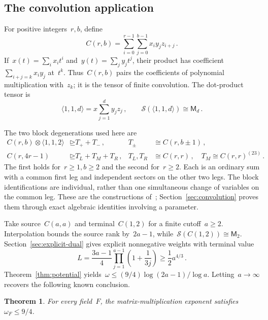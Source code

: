 \documentclass[11pt,letterpaper]{article}
\newtheorem{theorem}{Theorem}[section]
\theoremstyle{definition}
\numberwithin{equation}{section}
\newcommand{\MM}{\mathsf M}
\newcommand{\degen}{\unrhd}
\begin{document}
\subsection{The convolution application}

For positive integers~$r,b$, define
\begin{equation}\label{eq:convolution-definition}
 C(r,b)=\sum_{i=0}^{r-1}\sum_{j=0}^{b-1}x_i y_j z_{i+j}\,.
\end{equation}
If~$x(t)=\sum_i x_i t^i$ and~$y(t)=\sum_j y_j t^j$, their product has coefficient~$\sum_{i+j=k}x_i y_j$ at~$t^k$. Thus~$C(r,b)$ pairs the coefficients of polynomial multiplication with~$z_k$; it is the tensor of finite convolution. The dot-product tensor is
\begin{equation}\label{eq:balancing}
 \langle1,1,d\rangle=x\sum_{j=1}^d y_jz_j\,,\qquad
 \mathcal S(\langle1,1,d\rangle)\cong\MM_d\,.
\end{equation}

The two block degenerations used here are
\begin{equation*}
 \begin{aligned}
 C(r,b)\otimes \langle1,1,2\rangle&\degen T_++T_-\,,
 &T_\pm&\cong C(r,b\pm1)\,,\\
 C(r,4r-1)&\degen T_L+T_M+T_R\,,
 &T_L,T_R&\cong C(r,r)\,,\quad T_M\cong C(r,r)^{(23)}\,.
 \end{aligned}
\end{equation*}
The first holds for~$r\geq1,b\geq2$ and the second for~$r\geq2$. Each is an ordinary sum with a common first leg and independent sectors on the other two legs. The block identifications are individual, rather than one simultaneous change of variables on the common leg. These are the constructions of~\cite{OpenAI}; Section~\ref{sec:convolution} proves them through exact algebraic identities involving a parameter.

Take source~$C(a,a)$ and terminal~$C(1,2)$ for a finite cutoff~$a\geq2$. Interpolation bounds the source rank by~$2a-1$, while~$\mathcal S(C(1,2))\cong\MM_2$. Section~\ref{sec:explicit-dual} gives explicit nonnegative weights with terminal value
\begin{equation*}
 L=\frac{3a-1}{4}\prod_{j=1}^{a-1}\left(1+\frac1{3j}\right)
 \geq\frac12a^{4/3}\,.
\end{equation*}
Theorem~\ref{thm:potential} yields~$\omega\leq(9/4)\log(2a-1)/\log a$. Letting~$a\to\infty$ recovers the following known conclusion.

\begin{theorem}\label{thm:main}
For every field~$F$, the matrix-multiplication exponent satisfies~$\omega_F\leq9/4$.
\end{theorem}
\end{document}
